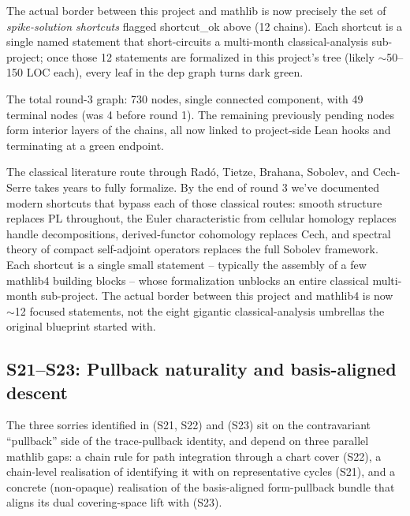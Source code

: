The actual border between this project and mathlib is now precisely
the set of \emph{spike-solution shortcuts} flagged \textsf{shortcut\_ok} above
(12 chains).  Each shortcut is a single named statement that
short-circuits a multi-month classical-analysis sub-project; once
those 12 statements are formalized in this project's 
tree (likely $\sim$50--150 LOC each), every leaf in the dep graph
turns dark green.

The total round-3 graph: 730 nodes, single connected component, with
49 \mathlibok{} terminal nodes (was 4 before round 1).  The remaining
previously pending nodes form interior layers of the chains, all now linked to
project-side Lean hooks and terminating at a green endpoint.

\begin{layman}
The classical literature route through Rad\'o, Tietze, Brahana,
Sobolev, and Cech-Serre takes years to fully formalize.  By the end
of round 3 we've documented modern shortcuts that bypass each of
those classical routes: smooth structure replaces PL throughout, the
Euler characteristic from cellular homology replaces handle
decompositions, derived-functor cohomology replaces Cech, and
spectral theory of compact self-adjoint operators replaces the full
Sobolev framework.  Each shortcut is a single small statement --
typically the assembly of a few mathlib4 building blocks -- whose
formalization unblocks an entire classical multi-month sub-project.
The actual border between this project and mathlib4 is now $\sim$12
focused statements, not the eight gigantic classical-analysis
umbrellas the original blueprint started with.
\end{layman}

\subsection{S21--S23: Pullback naturality and basis-aligned descent}
\label{subsec:gap-pullback-naturality}

The three sorries identified in
 (S21, S22) and
 (S23) sit on the contravariant
``pullback'' side of the trace-pullback identity, and depend on three
parallel mathlib gaps: a chain rule for path integration through a chart
cover (S22), a chain-level realisation of 
identifying it with  on representative cycles
(S21), and a concrete (non-opaque) realisation of the basis-aligned
form-pullback bundle that aligns its dual covering-space lift with
 (S23).

